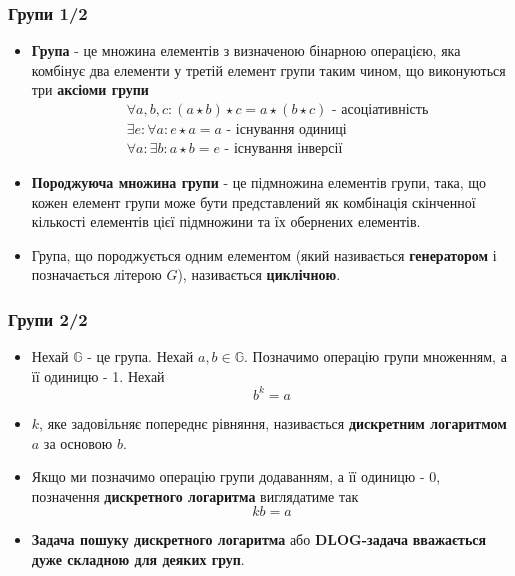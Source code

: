 \documentclass{beamer}
\begin{document}
\begin{frame}
  \frametitle{Групи 1/2}
  \begin{itemize}
  \item \textbf{Група} - це множина елементів з визначеною бінарною операцією,
    яка комбінує два елементи у третій елемент групи таким чином, що виконуються
    три \textbf{аксіоми групи}
    \begin{align*}
      &\forall a, b, c: (a \star b) \star c = a \star (b \star c) \text{ - асоціативність} \\
      &\exists e: \forall a: e \star a = a \text{ - існування одиниці} \\
      &\forall a: \exists b: a \star b = e \text{ - існування інверсії}
    \end{align*}
  \item \textbf{Породжуюча множина групи} - це підмножина елементів групи, така,
    що кожен елемент групи може бути представлений як комбінація скінченної
    кількості елементів цієї підмножини та їх обернених елементів.
  \item Група, що породжується одним елементом (який називається
    \textbf{генератором} і позначається літерою $G$), називається
    \textbf{циклічною}.
  \end{itemize}
\end{frame}

\begin{frame}
  \frametitle{Групи 2/2}
  \begin{itemize}
  \item Нехай $\mathbb{G}$ - це група. Нехай $a, b \in \mathbb{G}$. Позначимо
    операцію групи множенням, а її одиницю - 1. Нехай
    $$b^k = a$$
  \item $k$, яке задовільняє попереднє рівняння, називається \textbf{дискретним
      логаритмом} $a$ за основою $b$.
  \item Якщо ми позначимо операцію групи додаванням, а її одиницю - 0, позначення
    \textbf{дискретного логаритма} виглядатиме так
    $$kb = a$$
  \item \textbf{Задача пошуку дискретного логаритма} або \textbf{DLOG-задача}
    \textbf{вважається дуже складною для деяких груп}.
  \end{itemize}
\end{frame}
\end{document}
